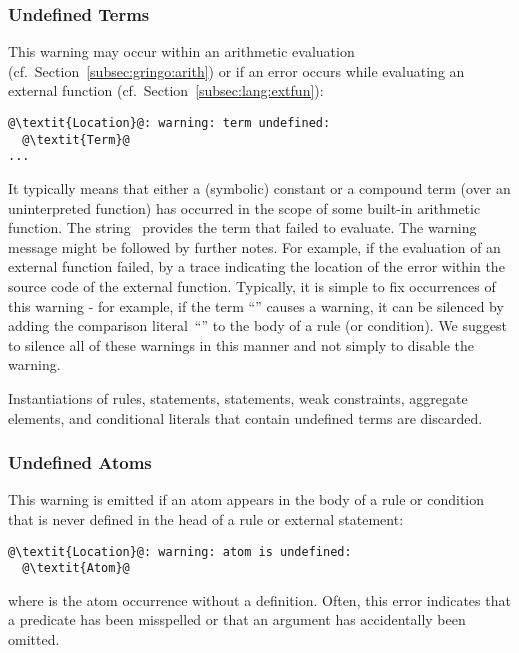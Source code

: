\subsubsection{Undefined Terms}\label{sec:warn:undefterm}
This warning may occur within an arithmetic evaluation (cf.~Section~\ref{subsec:gringo:arith})
or if an error occurs while evaluating an external function (cf.~Section~\ref{subsec:lang:extfun}):
%
\begin{lstlisting}[numbers=none,escapechar=@]
@\textit{Location}@: warning: term undefined:
  @\textit{Term}@
...
\end{lstlisting}
%
It typically means that either a (symbolic) constant or a compound term (over an uninterpreted function)
has occurred in the scope of some built-in arithmetic function.
%
The string~ provides the term that failed to evaluate.
%
The warning message might be followed by further notes.
For example, 
if the evaluation of an external function failed,
by a trace indicating the location of the error within the source code of the external function.
%
Typically, it is simple to fix occurrences of this warning
- for example, if the term ``'' causes a warning,
it can be silenced by adding the comparison literal~``'' to the body of a rule (or condition).
We suggest to silence all of these warnings in this manner
and not simply to disable the warning.

\begin{note}
Instantiations of rules,  statements,  statements, weak constraints, aggregate elements, and conditional literals
that contain undefined terms are discarded.
\end{note}

\subsubsection{Undefined Atoms}\label{sec:warn:undefatm}
This warning is emitted if an atom appears in the body of a rule or condition
that is never defined in the head of a rule or external statement:
\begin{lstlisting}[numbers=none,escapechar=@]
@\textit{Location}@: warning: atom is undefined:
  @\textit{Atom}@
\end{lstlisting}
%
where  is the atom occurrence without a definition.
Often, this error indicates that a predicate has been misspelled 
or that an argument has accidentally been omitted.

